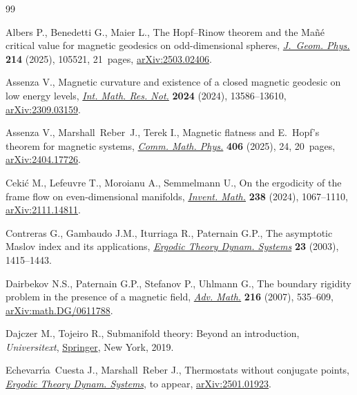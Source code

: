 \documentclass[10pt,a4paper]{amsart}
\numberwithin{equation}{section}
\theoremstyle{definition}
\begin{document}
\begin{thebibliography}{99}
\footnotesize\itemsep=0pt

Albers P., Benedetti G., Maier L., The {H}opf--{R}inow theorem and the
 {M}a\~{n}\'{e} critical value for magnetic geodesics on odd-dimensional
 spheres,
 \href{https://doi.org/10.1016/j.geomphys.2025.105521}{\textit{J.~Geom.
 Phys.}} \textbf{214} (2025), 105521, 21~pages,
 \href{http://arxiv.org/abs/2503.02406}{arXiv:2503.02406}.

Assenza V., Magnetic curvature and existence of a closed magnetic geodesic on
 low energy levels, \href{https://doi.org/10.1093/imrn/rnae209}{\textit{Int.
 Math. Res. Not.}} \textbf{2024} (2024), 13586--13610,
 \href{http://arxiv.org/abs/2309.03159}{arXiv:2309.03159}.

Assenza V., Marshall~Reber~J., Terek I., Magnetic flatness and {E}.~{H}opf's theorem
 for magnetic systems,
 \href{https://doi.org/10.1007/s00220-024-05166-5}{\textit{Comm. Math. Phys.}}
 \textbf{406} (2025), 24, 20~pages,
 \href{http://arxiv.org/abs/2404.17726}{arXiv:2404.17726}.

Ceki\'{c} M., Lefeuvre T., Moroianu A., Semmelmann U., On the ergodicity of the
 frame flow on even-dimensional manifolds,
 \href{https://doi.org/10.1007/s00222-024-01297-7}{\textit{Invent. Math.}}
 \textbf{238} (2024), 1067--1110,
 \href{http://arxiv.org/abs/2111.14811}{arXiv:2111.14811}.

Contreras G., Gambaudo J.M., Iturriaga R., Paternain G.P., The asymptotic
 {M}aslov index and its applications,
 \href{https://doi.org/10.1017/S0143385703000063}{\textit{Ergodic Theory
 Dynam. Systems}} \textbf{23} (2003), 1415--1443.

Dairbekov N.S., Paternain G.P., Stefanov P., Uhlmann G., The boundary rigidity
 problem in the presence of a magnetic field,
 \href{https://doi.org/10.1016/j.aim.2007.05.014}{\textit{Adv. Math.}}
 \textbf{216} (2007), 535--609,
 \href{http://arxiv.org/abs/math.DG/0611788}{arXiv:math.DG/0611788}.

Dajczer M., Tojeiro R., Submanifold theory: {B}eyond an introduction,
 \textit{Universitext}, \href{https://doi.org/10.1007/978-1-4939-9644-5}{Springer}, New
 York, 2019.

Echevarr\'{\i}a~Cuesta J., Marshall~Reber J., Thermostats without conjugate
 points, \href{http://dx.doi.org/10.1017/etds.2026.10285}{\textit{Ergodic
 Theory Dynam. Systems}}, {t}o appear,
 \href{http://arxiv.org/abs/2501.01923}{arXiv:2501.01923}.


\end{thebibliography}
\end{document}
